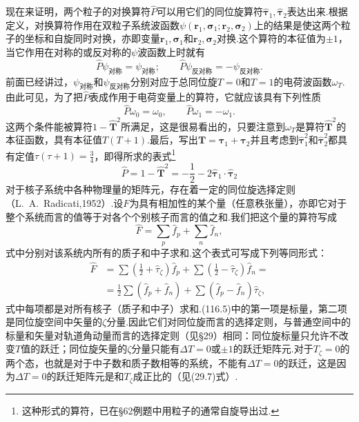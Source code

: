 现在来证明，两个粒子的对换算符$\hat{P}$可以用它们的同位旋算符$\hat{\boldsymbol{\tau}}_1,\hat{\boldsymbol{\tau}}_2$表达出来.根据定义，对换算符作用在双粒子系统波函数$\psi(\boldsymbol{r}_1,\boldsymbol{\sigma}_1;\boldsymbol{r}_2,\boldsymbol{\sigma}_2)$上的结果是使这两个粒子的坐标和自旋同时对换，亦即变量$\boldsymbol{r}_1,\boldsymbol{\sigma}_1$和$\boldsymbol{r}_2,\boldsymbol{\sigma}_2$对换.这个算符的本征值为$\pm1$，当它作用在对称的或反对称的$\psi$波函数上时就有
\begin{equation}
  \hat{P}\psi_{\text{对称}}=\psi_{\text{对称}};\qquad
  \hat{P}\psi_{\text{反对称}}=-\psi_{\text{反对称}}.
\end{equation}
前面已经讲过，$\psi_{\text{对称}}$和$\psi_{\text{反对称}}$分别对应于总同位旋$T=0$和$T=1$的电荷波函数$\omega_T$.由此可见，为了把$\hat{P}$表成作用于电荷变量上的算符，它就应该具有下列性质
\begin{equation}
  \hat{P}\omega_0=\omega_0,\qquad\hat{P}\omega_1=-\omega_1.
\end{equation}
这两个条件能被算符$1-\hat{\boldsymbol{T}}^2$所满足，这是很易看出的，只要注意到$\omega_T$是算符$\hat{\boldsymbol{T}}^2$的本征函数，具有本征值$T(T+1)$.最后，写出$\boldsymbol{T}=\boldsymbol{\tau}_1+\boldsymbol{\tau}_2$并且考虑到$\hat{\boldsymbol{\tau}}_1^2$和$\hat{\boldsymbol{\tau}}_2^2$都具有定值$\tau(\tau+1)=\frac{3}{4}$，即得所求的表式\footnote{这种形式的算符，已在§62例题中用粒子的通常自旋导出过.}
\begin{equation}
  \hat{P}=1-\hat{\boldsymbol{T}}^2
  =-\frac{1}{2}-2\hat{\boldsymbol{\tau}}_1\cdot\hat{\boldsymbol{\tau}}_2
\end{equation}
对于核子系统中各种物理量的矩阵元，存在着一定的同位旋选择定则（L.~A.~Radicati,1952）.设$F$为具有相加性的某个量（任意秩张量），亦即它对于整个系统而言的值等于对各个个别核子而言的值之和.我们把这个量的算符写成
\begin{equation*}
  \hat{F}=\sum_p\hat{f}_p+\sum_n\hat{f}_n,
\end{equation*}
式中分别对该系统内所有的质子和中子求和.这个表式可写成下列等同形式：
\begin{equation}
\begin{aligned}
  \hat{F}&=\sum\left(\frac{1}{2}+\hat{\tau}_\zeta\right)\hat{f}_p
  +\sum\left(\frac{1}{2}-\hat{\tau}_\zeta\right)\hat{f}_n=\\
  &=\frac{1}{2}\sum\left(\hat{f}_p+\hat{f}_n\right)
  +\sum\left(\hat{f}_p-\hat{f}_n\right)\hat{\tau}_\zeta,
\end{aligned}
\end{equation}
式中每项都是对所有核子（质子和中子）求和.(116.5)中的第一项是标量，第二项是同位旋空间中矢量的$\zeta$分量.因此它们对同位旋而言的选择定则，与普通空间中的标量和矢量对轨道角动量而言的选择定则（见§29）相同：同位旋标量只允许不改变$T$值的跃迁；同位旋矢量的$\zeta$分量只能有$\Delta T=0$或$\pm1$的跃迁矩阵元.对于$T_\zeta=0$的两个态，也就是对于中子数和质子数相等的系统，不能有$\Delta T=0$的跃迁，这是因为$\Delta T=0$的跃迁矩阵元是和$T_\zeta$成正比的（见(29.7)式）.


